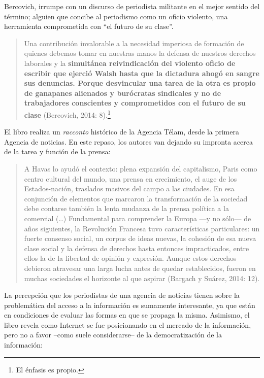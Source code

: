 Bercovich, irrumpe con un discurso de periodista militante en el mejor sentido del término; alguien que concibe al periodismo como un oficio violento, una herramienta comprometida con ``el futuro de su clase''.

\begin{quote}
Una contribución invalorable a la necesidad imperiosa de formación de quienes debemos tomar en nuestras manos la defensa de nuestros derechos laborales y la \textbf{simultánea reivindicación del violento oficio de escribir que ejerció Walsh hasta que la dictadura ahogó en sangre sus denuncias. Porque desvincular una tarea de la otra es propio de ganapanes alienados y burócratas sindicales y no de trabajadores conscientes y comprometidos con el futuro de su clase} (Bercovich, 2014: 8).\footnote{El énfasis es propio.}
\end{quote}

El libro realiza un \emph{racconto} histórico de la Agencia Télam, desde la primera Agencia de noticias. En este repaso, los autores van dejando su impronta acerca de la tarea y función de la prensa:

\begin{quote}
A Havas lo ayudó el contexto: plena expansión del capitalismo, Paris como centro cultural del mundo, una prensa en crecimiento, el auge de los Estados-nación, traslados masivos del campo a las ciudades. En esa conjunción de elementos que marcaron la transformación de la sociedad debe contarse también la lenta mudanza de la prensa política a la comercial (\ldots) Fundamental para comprender la Europa ---y no sólo--- de años siguientes, la Revolución Francesa tuvo características particulares: un fuerte consenso social, un corpus de ideas nuevas, la cohesión de esa nueva clase social y la defensa de derechos hasta entonces impracticados, entre ellos la de la libertad de opinión y expresión. Aunque estos derechos debieron atravesar una larga lucha antes de quedar establecidos, fueron en muchas sociedades el horizonte al que aspirar (Bargach y Suárez, 2014: 12).
\end{quote}

La percepción que los periodistas de una agencia de noticias tienen sobre la problemática del acceso a la información es sumamente interesante, ya que están en condiciones de evaluar las formas en que se propaga la misma. Asimismo, el libro revela como Internet se fue posicionando en el mercado de la información, pero no a favor --como suele considerarse-- de la democratización de la información:

